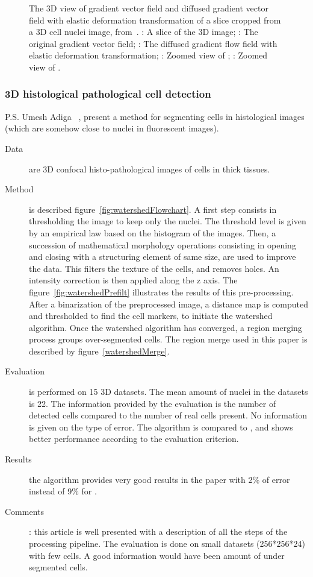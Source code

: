 \begin{figure}[h]
\caption{%
The 3D view of gradient vector field and diffused gradient vector field with elastic deformation transformation of a slice cropped from a 3D cell nuclei image, from~\cite{li20073}.
: A slice of the 3D image;
: The original gradient vector field;
: The diffused gradient flow field with elastic deformation transformation;
: Zoomed view of ;
: Zoomed view of .}
\end{figure}
\clearpage

\subsubsection*{3D histological pathological cell detection}
 P.S. Umesh Adiga {\etal}~\cite{umesh2001efficient}, present a method for segmenting cells in histological images 
  (which are somehow close to nuclei in fluorescent images).
  \begin{description}
  \item[Data] are 3D confocal histo-pathological images of cells in thick tissues.
  \item[Method] is described figure~\ref{fig:watershedFlowchart}.
  A first step consists in thresholding the image to keep only the nuclei. The threshold level is given by an empirical law based on the histogram of the images.
  Then, a succession of mathematical morphology operations consisting in opening and closing with a structuring element of same size, are used to improve the data. 
  This filters the texture of the cells, and removes holes.
  An intensity correction is then applied along the z axis. The figure~\ref{fig:watershedPrefilt} illustrates the results of this pre-processing.
  After a binarization of the preprocessed image, a distance map is computed and thresholded to find the cell markers, to initiate the watershed algorithm.
  Once the watershed algorithm has converged, a region merging process groups over-segmented cells. The region merge used in this paper is described by figure~\ref{watershedMerge}.
  \item[Evaluation] is performed on 15 3D datasets. The mean amount of nuclei in the datasets is 22. The information provided by the evaluation is the number of detected cells compared to the number of real cells present. No information is given on the type of error. The algorithm is compared to \cite{malpica1997applying}, and shows better performance according to the evaluation criterion.
  \item[Results] the algorithm provides very good results in the paper with 2\% of error instead of 9\% for \cite{malpica1997applying}.
  \item[Comments]: this article is well presented with a description of all the steps of the processing pipeline.
  The evaluation is done on small datasets (256*256*24) with few cells. A good information would have been amount of under segmented cells. 
\end{description}
